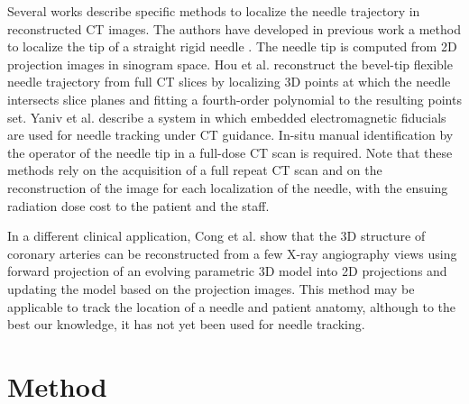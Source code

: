 Several works describe specific methods to localize the needle trajectory in reconstructed CT images. The authors have developed in previous work a method to 
localize the tip of a straight rigid needle \cite{medan2017reduced}. The needle tip  is computed from 2D projection images in sinogram space. 
Hou et al. \cite{huo2015shape} reconstruct the bevel-tip flexible needle trajectory from full CT slices by localizing 3D points at which the needle intersects slice planes and fitting a fourth-order polynomial to the resulting points set.
Yaniv et al. \cite{yaniv2010needle} describe a system in which embedded electromagnetic fiducials are used for needle tracking under CT guidance. In-situ manual identification by the operator of the needle tip in a full-dose CT scan is required. Note that these methods rely on the acquisition of a full repeat CT scan and on the reconstruction of the image for each localization of the needle, with the ensuing radiation dose cost to the patient and the staff.

In a different clinical application, Cong et al.  \cite{cong2015quantitative} show that the 3D structure of coronary arteries can be reconstructed from a few X-ray angiography views using forward projection of an evolving parametric 3D model into 2D projections and updating the model based on the projection images. This method may be applicable to track the location of a needle and patient anatomy, although to the best our knowledge, it has not yet been used for needle tracking. 

\section*{Method}

